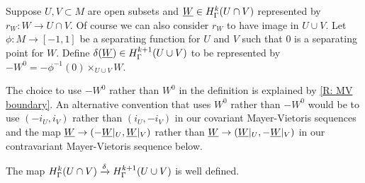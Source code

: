 \begin{definition}
Suppose $U,V \subset M$ are open subsets and $\underline{W} \in H^k_\Gamma(U \cap V)$ represented by $r_W \colon W \to U \cap V$. Of course we can also consider $r_W$ to have image in $U \cup V$. Let $\phi:M \to [-1,1]$ be a separating function for $U$ and $V$ such that $0$ is a separating point for $W$.
Define $\delta(\underline{W}) \in H^{k+1}_\Gamma(U \cup V)$ to be represented by $-W^0 = -\phi^{-1}(0)\times_{U \cup V}W$.
\end{definition}

The choice to use $-W^0$ rather than $W^0$ in the definition is explained by \cref{R: MV boundary}. An alternative convention that uses $W^0$ rather than $-W^0$ would be to use $(-i_U,i_V)$ rather than $(i_U,-i_V)$ in our covariant Mayer-Vietoris sequences and the map $\underline{W} \to (-\underline{W}|_U, \underline{W}|_V)$ rather than $\underline{W} \to (\underline{W}|_U, -\underline{W}|_V)$ in our contravariant Mayer-Vietoris sequence below.



\begin{proposition}\label{P: connecting}
The map $H^k_\Gamma(U \cap V)\xrightarrow{\delta} H^{k+1}_\Gamma(U \cup V)$ is well defined.
\end{proposition}

